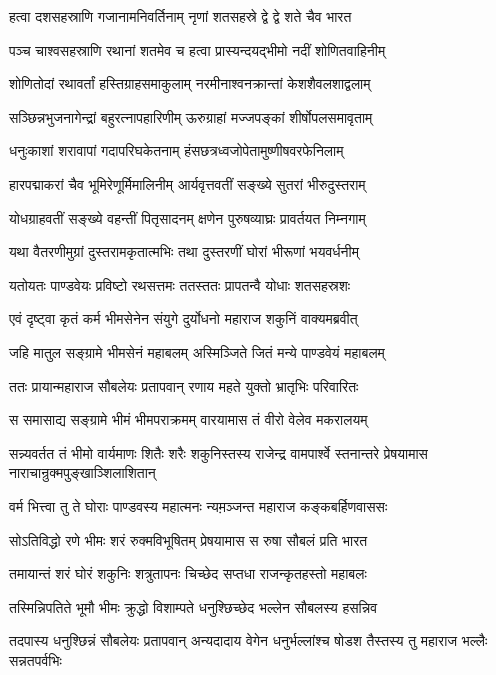 \twolineshloka
{हत्वा दशसहस्राणि गजानामनिवर्तिनाम्}
{नृणां शतसहस्रे द्वे द्वे शते चैव भारत}


\twolineshloka
{पञ्च चाश्वसहस्राणि रथानां शतमेव च}
{हत्वा प्रास्यन्दयद्भीमो नदीं शोणितवाहिनीम्}


\twolineshloka
{शोणितोदां रथावर्तां हस्तिग्राहसमाकुलाम्}
{नरमीनाश्वनक्रान्तां केशशैवलशाद्वलाम्}


\twolineshloka
{सञ्छिन्नभुजनागेन्द्रां बहुरत्नापहारिणीम्}
{ऊरुग्राहां मज्जपङ्कां शीर्षोपलसमावृताम्}


\twolineshloka
{धनुःकाशां शरावापां गदापरिघकेतनाम्}
{हंसछत्रध्वजोपेतामुष्णीषवरफेनिलाम्}


\twolineshloka
{हारपद्माकरां चैव भूमिरेणूर्मिमालिनीम्}
{आर्यवृत्तवतीं सङ्ख्ये सुतरां भीरुदुस्तराम्}


\twolineshloka
{योधग्राहवतीं सङ्ख्ये वहन्तीं पितृसादनम्}
{क्षणेन पुरुषव्याघ्रः प्रावर्तयत निम्नगाम्}


\twolineshloka
{यथा वैतरणीमुग्रां दुस्तरामकृतात्मभिः}
{तथा दुस्तरणीं घोरां भीरूणां भयवर्धनीम्}


\twolineshloka
{यतोयतः पाण्डवेयः प्रविष्टो रथसत्तमः}
{ततस्ततः प्रापतन्वै योधाः शतसहस्रशः}


\twolineshloka
{एवं दृष्ट्वा कृतं कर्म भीमसेनेन संयुगे}
{दुर्योधनो महाराज शकुनिं वाक्यमब्रवीत्}


\twolineshloka
{जहि मातुल सङ्ग्रामे भीमसेनं महाबलम्}
{अस्मिञ्जिते जितं मन्ये पाण्डवेयं महाबलम्}


\twolineshloka
{ततः प्रायान्महाराज सौबलेयः प्रतापवान्}
{रणाय महते युक्तो भ्रातृभिः परिवारितः}


\twolineshloka
{स समासाद्य सङ्ग्रामे भीमं भीमपराक्रमम्}
{वारयामास तं वीरो वेलेव मकरालयम्}


\threelineshloka
{सन्न्यवर्तत तं भीमो वार्यमाणः शितैः शरैः}
{शकुनिस्तस्य राजेन्द्र वामपार्श्वे स्तनान्तरे}
{प्रेषयामास नाराचान्रुक्मपुङ्खाञ्शिलाशितान्}


\twolineshloka
{वर्म भित्त्वा तु ते घोराः पाण्डवस्य महात्मनः}
{न्यम़ञ्जन्त महाराज कङ्कबर्हिणवाससः}


\twolineshloka
{सोऽतिविद्धो रणे भीमः शरं रुक्मविभूषितम्}
{प्रेषयामास स रुषा सौबलं प्रति भारत}


\twolineshloka
{तमायान्तं शरं घोरं शकुनिः शत्रुतापनः}
{चिच्छेद सप्तधा राजन्कृतहस्तो महाबलः}


\twolineshloka
{तस्मिन्निपतिते भूमौ भीमः क्रुद्धो विशाम्पते}
{धनुश्छिच्छेद भल्लेन सौबलस्य हसन्निव}


\threelineshloka
{तदपास्य धनुश्छिन्नं सौबलेयः प्रतापवान्}
{अन्यदादाय वेगेन धनुर्भल्लांश्च षोडश}
{तैस्तस्य तु महाराज भल्लैः सन्नतपर्वभिः}


